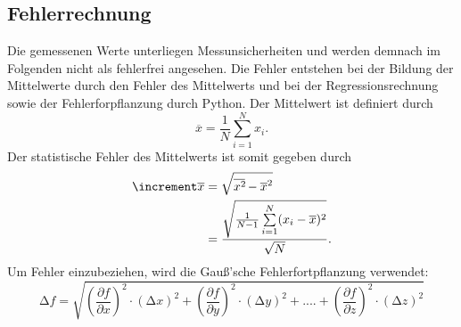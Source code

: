 \subsection{Fehlerrechnung}
Die gemessenen Werte unterliegen Messunsicherheiten und werden demnach im
Folgenden nicht als fehlerfrei angesehen. Die Fehler entstehen bei der
Bildung der Mittelwerte durch den Fehler des Mittelwerts und bei der
Regressionsrechnung sowie der Fehlerforpflanzung durch Python.
Der Mittelwert ist definiert durch
\begin{equation}
    \overline{x} = \frac{1}{N} \sum\limits_{i=1}^N x_i.
\end{equation}
\noindent Der statistische Fehler des Mittelwerts ist somit gegeben durch 
\begin{equation}
    \begin{aligned}
        \increment \overline{x} &= \sqrt{\overline{x^2\kern-0.1em} - \overline{x}^2} \\
                            &= \frac{\sqrt{\frac{1}{N-1} \sum\limits_{i=1}^N (x_i - \overline{x})^2}}{\sqrt{N}}.
    \end{aligned}
\end{equation}
Um Fehler einzubeziehen, wird die Gauß'sche Fehlerfortpflanzung verwendet:
\begin{equation}
    \label{eqn:9}
    \increment f = \sqrt{\left(\frac{\partial f}{\partial x}\right)^2 \cdot \left(\increment x\right)^2 + \left(\frac{\partial f}{\partial y}\right)^2 \cdot \left(\increment y\right)^2 + .... + \left(\frac{\partial f}{\partial z}\right)^2 \cdot \left(\increment z\right)^2}
\end{equation}